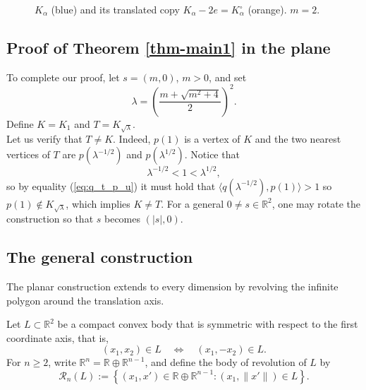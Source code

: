 \documentclass[12pt]{article}
\theoremstyle{remark}
\newcommand{\R}{\mathbb R}
\begin{document}
\begin{figure}[h]
\caption{ $K_{\alpha}$ (blue) and its translated copy $K_{\alpha}-2e=K_{\alpha}^{\circ}$ (orange). $m=2.$}
\label{fig:K_alpha_and_dual}
\end{figure}

\subsection{Proof of Theorem \ref{thm-main1} in the plane}
To complete our proof, let \(s=(m,0)\), \(m>0\), and set
     \[
     \lambda=\left(\frac{m+\sqrt{m^2+4}}2\right)^2.
     \]
Define $K = K_1$ and $T=K_{\sqrt{\lambda}}$. \\
Let us verify that $T \neq K$. Indeed, $p(1)$ is a vertex of $K$ and the two nearest vertices of $T$ are $p(\lambda^{-1/2})$ and $p(\lambda^{1/2})$. Notice that 
\[
\lambda^{-1/2} < 1 < \lambda^{1/2},
\]
so by equality (\ref{eq:q_t_p_u})
it must hold that $\langle q(\lambda^{-1/2}), p(1) \rangle > 1$ so $p(1) \notin K_{\sqrt{\lambda}}$, which implies $K\neq T.$ For a general  $0\neq s\in \R^2$, one may rotate the construction so that $s$ becomes $(|s|,0)$.
\subsection{The general construction}\label{sec:revolution}

The planar construction extends to every dimension by revolving the infinite polygon around the translation axis.  

Let \(L\subset\R^2\) be a compact convex body that is symmetric with respect to the
first coordinate axis, that is,
\[
        (x_1,x_2)\in L\quad\Longleftrightarrow\quad (x_1,-x_2)\in L.
\]
For \(n\ge2\), write \(\R^n=\R\oplus\R^{n-1}\), and define the body of revolution
of \(L\) by
\begin{equation}\label{eq:revolution-definition}
        \mathcal R_n(L)
        :=\left\{(x_1,x')\in\R\oplus\R^{n-1}:
        (x_1,\|x'\|)\in L\right\}.
\end{equation}
\end{document}
